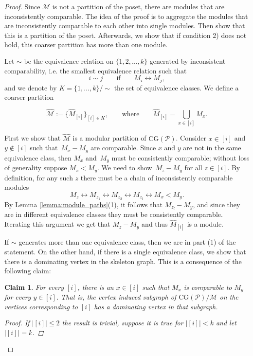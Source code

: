 \documentclass[9pt,a4paper,oneside]{article}
\newtheorem*{claim*}{Claim}
\newcommand{\cM}{\mathcal{M}}
\newcommand{\cP}{\mathcal{P}}
\newcommand{\CG}{\mathrm{CG}}
\begin{document}
\begin{proof}
Since $\cM$ is not a partition of the poset, there are modules that are inconsistently comparable. The idea of the proof is to aggregate the modules that are inconsistently comparable to each other into single modules. Then show that this is a partition of the poset. Afterwards, we show that if condition 2) does not hold, this coarser partition has more than one module.

Let ${\sim}$ be the equivalence relation on $\{1, 2, \ldots, k\}$ generated by inconsistent comparability, i.e. 
the smallest equivalence relation such that
\[i\sim j \quad\quad \text{if} \quad\quad M_i\leftrightarrow M_j,\] 
and we denote by $K= \{1, \ldots, k\}/\sim$ the set of equivalence classes. 
We define a coarser partition 

\[\widehat{\cM}:=\lbrace\widehat{M}_{[i]}\rbrace_{[i]\in K}, 
\quad\quad \text{where}\quad\quad
\widehat{M}_{[i]}=\bigcup_{x\in [i]} M_x.
\]

First we show that $\widehat{\cM}$ is a modular partition of $\CG(\cP)$.
Consider $x\in [i]$ and $y\not\in [i]$ such that~$M_x-M_y$ are comparable.
Since $x$ and $y$ are not in the same equivalence class, then $M_x$ and~$M_y$ must be consistently comparable; without loss of generality suppose $M_x<M_y$.
We need to show~$M_z-M_y$ for all $z\in [i]$.
By definition, for any such $z$ there must be a chain of inconsistently comparable modules 
\[M_z\leftrightarrow M_{z_1} \leftrightarrow M_{z_2} \leftrightarrow M_{z_l} \leftrightarrow M_{x} < M_y.\]
By Lemma \ref{lemma:module_paths}(1), it follows that $M_{z_l}-M_y$, and since they are in different equivalence classes they must be consistently comparable. Iterating this argument we get that $M_z-M_y$ and thus $\widehat{M}_{[i]}$ is a module. 

If ${\sim}$ generates more than one equivalence class, then we are in part (1) of the statement.
On the other hand, if there is a single equivalence class, we show that there is a dominating vertex in the skeleton graph.
This is a consequence of the following claim:
 
\begin{claim*}
For every $[i]$, there is an $x\in[i]$ such that $M_x$ is comparable to $M_y$ for every $y\in[i]$. That is, the vertex induced subgraph of $\CG(\cP)/\cM$ on the vertices corresponding to $[i]$ has a dominating vertex in that subgraph. 
\begin{proof}
If $|[i]|\leq 2$ the result is trivial, suppose it is true for $|[i]|<k$ and let $|[i]|=k$.


\end{proof}
\end{claim*}
\end{proof}
\end{document}

